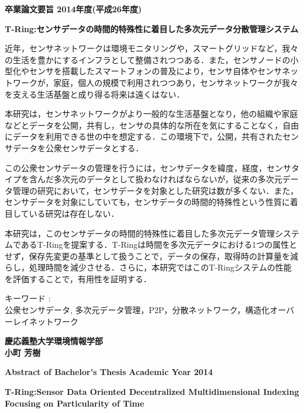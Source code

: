 \begin{center}
\textbf{\Large 卒業論文要旨 2014年度(平成26年度)}

\vspace{6.18mm}

\textbf{\Large T-Ring:センサデータの時間的特殊性に着目した多次元データ分散管理システム}
\end{center}

\vspace{10mm}
近年，センサネットワークは環境モニタリングや，スマートグリッドなど，我々の生活を豊かにするインフラとして整備されつつある．また，センサノードの小型化やセンサを搭載したスマートフォンの普及により，センサ自体やセンサネットワークが，家庭，個人の規模で利用されつつあり，センサネットワークが我々を支える生活基盤と成り得る将来は遠くはない．

本研究は，センサネットワークがより一般的な生活基盤となり，他の組織や家庭などとデータを公開，共有し，センサの具体的な所在を気にすることなく，自由にデータを利用できる世の中を想定する．この環境下で，公開，共有されたセンサデータを公衆センサデータとする．

この公衆センサデータの管理を行うには，センサデータを緯度，経度，センサタイプを含んだ多次元のデータとして扱わなければならないが，従来の多次元データ管理の研究において，センサデータを対象とした研究は数が多くない．また，センサデータを対象にしていても，センサデータの時間的特殊性という性質に着目している研究は存在しない．

本研究は，このセンサデータの時間的特殊性に着目した多次元データ管理システムであるT-Ringを提案する．T-Ringは時間を多次元データにおける1つの属性とせず，保存先変更の基準として扱うことで，データの保存，取得時の計算量を減らし，処理時間を減少させる．さらに，本研究ではこのT-Ringシステムの性能を評価することで，有用性を証明する．

\vspace{10mm}
キーワード :\\
\hspace{3.5em}公衆センサデータ, 多次元データ管理，P2P，分散ネットワーク，構造化オーバーレイネットワーク

\begin{flushright}
\textbf{慶応義塾大学環境情報学部}\\
\textbf{小町 芳樹}
\end{flushright}

\newpage

\begin{center}
\textbf{\Large Abstract of Bachelor's Thesis}
\textbf{\Large Academic Year 2014}
\vspace{6.18mm}

\textbf{\Large T-Ring:Sensor Data Oriented Decentralized Multidimensional Indexing Focusing on Particularity of Time}
\end{center}

